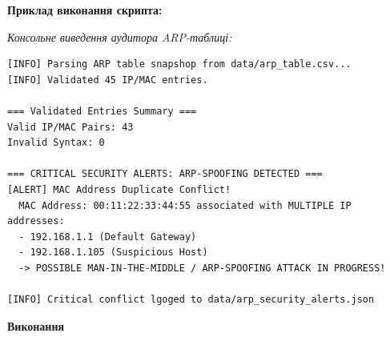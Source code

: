 \documentclass[10pt, a4paper]{article}
\begin{document}
\textbf{Приклад виконання скрипта:}

\textit{Консольне виведення аудитора ARP-таблиці:}
\small\begin{lstlisting}
[INFO] Parsing ARP table snapshop from data/arp_table.csv...
[INFO] Validated 45 IP/MAC entries.

=== Validated Entries Summary ===
Valid IP/MAC Pairs: 43
Invalid Syntax: 0

=== CRITICAL SECURITY ALERTS: ARP-SPOOFING DETECTED ===
[ALERT] MAC Address Duplicate Conflict!
  MAC Address: 00:11:22:33:44:55 associated with MULTIPLE IP addresses:
  - 192.168.1.1 (Default Gateway)
  - 192.168.1.105 (Suspicious Host)
  -> POSSIBLE MAN-IN-THE-MIDDLE / ARP-SPOOFING ATTACK IN PROGRESS!

[INFO] Critical conflict lgoged to data/arp_security_alerts.json
\end{lstlisting}
\textbf{Виконання}
\end{document}
